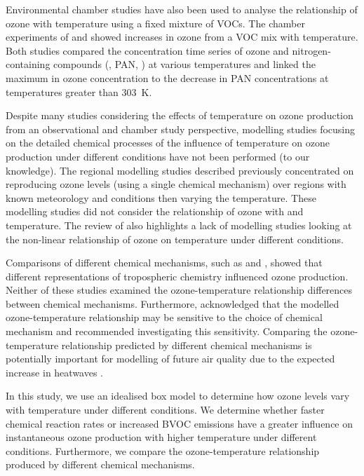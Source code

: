 Environmental chamber studies have also been used to analyse the relationship of ozone with temperature using a fixed mixture of VOCs.
The chamber experiments of \citet{Carter:1979} and \citet{Hatakeyama:1991} showed increases in ozone from a VOC mix with temperature.
Both studies compared the concentration time series of ozone and nitrogen-containing compounds (, PAN, ) at various temperatures and linked the maximum in ozone concentration to the decrease in PAN concentrations at temperatures greater than $303$~K.

Despite many studies considering the effects of temperature on ozone production from an observational and chamber study perspective, modelling studies focusing on the detailed chemical processes of the influence of temperature on ozone production under different  conditions have not been performed (to our knowledge).
The regional modelling studies described previously concentrated on reproducing ozone levels (using a single chemical mechanism) over regions with known meteorology and  conditions then varying the temperature.
These modelling studies did not consider the relationship of ozone with  and temperature.
The review of \citet{Pusede:2015} also highlights a lack of modelling studies looking at the non-linear relationship of ozone on temperature under different  conditions.

Comparisons of different chemical mechanisms, such as \citet{Emmerson:2009} and \citet{Coates:2015}, showed that different representations of tropospheric chemistry influenced ozone production.
Neither of these studies examined the ozone-temperature relationship differences between chemical mechanisms.
Furthermore, \citet{Rasmussen:2013} acknowledged that the modelled ozone-temperature relationship may be sensitive to the choice of chemical mechanism and recommended investigating this sensitivity.
Comparing the ozone-temperature relationship predicted by different chemical mechanisms is potentially important for modelling of future air quality due to the expected increase in heatwaves \citep{Karl:2003}.

In this study, we use an idealised box model to determine how ozone levels vary with temperature under different  conditions.
We determine whether faster chemical reaction rates or increased BVOC emissions have a greater influence on instantaneous ozone production with higher temperature under different  conditions.
Furthermore, we compare the ozone-temperature relationship produced by different chemical mechanisms.
